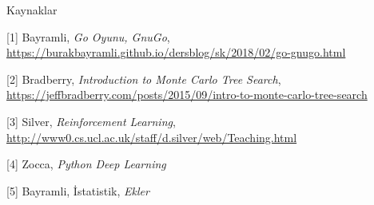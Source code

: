 \documentclass[12pt,fleqn]{article}\usepackage{../../common}
\begin{document}
Kaynaklar

[1] Bayramli, 
   {\em Go Oyunu, GnuGo}, 
   \url{https://burakbayramli.github.io/dersblog/sk/2018/02/go-gnugo.html}

[2] Bradberry, {\em Introduction to Monte Carlo Tree Search}, 
    \url{https://jeffbradberry.com/posts/2015/09/intro-to-monte-carlo-tree-search}

[3] Silver, {\em Reinforcement Learning}, 
    \url{http://www0.cs.ucl.ac.uk/staff/d.silver/web/Teaching.html}

[4] Zocca, {\em Python Deep Learning}

[5] Bayramli, İstatistik, {\em Ekler}
\end{document}

